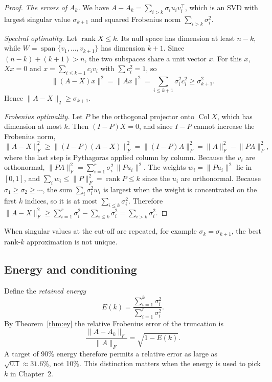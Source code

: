 \documentclass[12pt,a4paper]{report}
\newcommand{\norm}[1]{\lVert #1\rVert}
\newcommand{\T}{^{\top}}
\DeclareMathOperator{\rank}{rank}
\DeclareMathOperator{\Col}{Col}
\theoremstyle{plain}
\theoremstyle{definition}
\theoremstyle{remark}
\theoremstyle{definition}
\begin{document}
\begin{proof}
\emph{The errors of $A_k$.} We have $A-A_k=\sum_{i>k}\sigma_iu_iv_i\T$, which is an SVD with largest singular value $\sigma_{k+1}$ and squared Frobenius norm $\sum_{i>k}\sigma_i^2$.

\emph{Spectral optimality.} Let $\rank X\le k$. Its null space has dimension at least $n-k$, while $W=\operatorname{span}\{v_1,\dots,v_{k+1}\}$ has dimension $k+1$. Since $(n-k)+(k+1)>n$, the two subspaces share a unit vector $x$. For this $x$, $Xx=0$ and $x=\sum_{i\le k+1}c_iv_i$ with $\sum c_i^2=1$, so
\[
\norm{(A-X)x}^2=\norm{Ax}^2=\sum_{i\le k+1}\sigma_i^2c_i^2\ge\sigma_{k+1}^2 .
\]
Hence $\norm{A-X}_2\ge\sigma_{k+1}$.

\emph{Frobenius optimality.} Let $P$ be the orthogonal projector onto $\Col X$, which has dimension at most $k$. Then $(I-P)X=0$, and since $I-P$ cannot increase the Frobenius norm,
\[
\norm{A-X}_F^2\ge\norm{(I-P)(A-X)}_F^2=\norm{(I-P)A}_F^2=\norm{A}_F^2-\norm{PA}_F^2,
\]
where the last step is Pythagoras applied column by column. Because the $v_i$ are orthonormal, $\norm{PA}_F^2=\sum_{i=1}^r\sigma_i^2\,\norm{Pu_i}^2$. The weights $w_i=\norm{Pu_i}^2$ lie in $[0,1]$, and $\sum_iw_i\le\norm{P}_F^2=\rank P\le k$ since the $u_i$ are orthonormal. Because $\sigma_1\ge\sigma_2\ge\cdots$, the sum $\sum_i\sigma_i^2w_i$ is largest when the weight is concentrated on the first $k$ indices, so it is at most $\sum_{i\le k}\sigma_i^2$. Therefore $\norm{A-X}_F^2\ge\sum_{i=1}^r\sigma_i^2-\sum_{i\le k}\sigma_i^2=\sum_{i>k}\sigma_i^2$.
\end{proof}

When singular values at the cut-off are repeated, for example $\sigma_k=\sigma_{k+1}$, the best rank-$k$ approximation is not unique.

\subsection{Energy and conditioning}\label{sec:cond}

Define the \emph{retained energy}
\[
E(k)=\frac{\sum_{i=1}^k\sigma_i^2}{\sum_{i=1}^r\sigma_i^2}.
\]
By Theorem~\ref{thm:ey} the relative Frobenius error of the truncation is
\begin{equation}\label{eq:relerr}
\frac{\norm{A-A_k}_F}{\norm{A}_F}=\sqrt{1-E(k)} .
\end{equation}
A target of 90\% energy therefore permits a relative error as large as $\sqrt{0.1}\approx31.6\%$, not 10\%. This distinction matters when the energy is used to pick $k$ in Chapter~2.
\end{document}
